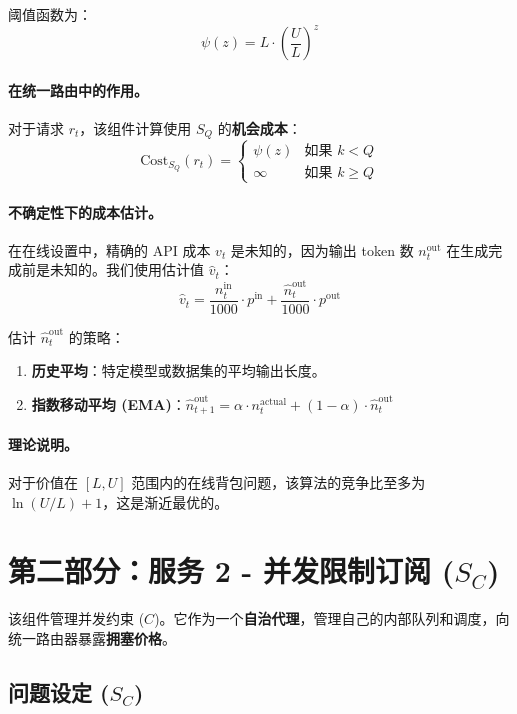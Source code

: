 \documentclass[11pt]{article}
\begin{document}
阈值函数为：
\[ \psi(z) = L \cdot \left( \frac{U}{L} \right)^z \]

\paragraph{在统一路由中的作用。}
对于请求 $r_t$，该组件计算使用 $S_Q$ 的\textbf{机会成本}：
\[ \text{Cost}_{S_Q}(r_t) = \begin{cases} \psi(z) & \text{如果 } k < Q \\ \infty & \text{如果 } k \ge Q \end{cases} \]

\paragraph{不确定性下的成本估计。}
在在线设置中，精确的 API 成本 $v_t$ 是未知的，因为输出 token 数 $n_t^{\text{out}}$ 在生成完成前是未知的。我们使用估计值 $\hat{v}_t$：
\[ \hat{v}_t = \frac{n_t^{\text{in}}}{1000} \cdot p^{\text{in}} + \frac{\hat{n}_t^{\text{out}}}{1000} \cdot p^{\text{out}} \]

估计 $\hat{n}_t^{\text{out}}$ 的策略：
\begin{enumerate}
  \item \textbf{历史平均}：特定模型或数据集的平均输出长度。
  \item \textbf{指数移动平均 (EMA)}：$\hat{n}_{t+1}^{\text{out}} = \alpha \cdot n_t^{\text{actual}} + (1-\alpha) \cdot \hat{n}_t^{\text{out}}$
\end{enumerate}

\paragraph{理论说明。}
对于价值在 $[L, U]$ 范围内的在线背包问题，该算法的竞争比至多为 $\ln(U/L) + 1$，这是渐近最优的。

\section{第二部分：服务 2 - 并发限制订阅 ($S_C$)}
\label{sec:part2}

该组件管理并发约束 ($C$)。它作为一个\textbf{自治代理}，管理自己的内部队列和调度，向统一路由器暴露\textbf{拥塞价格}。

\subsection{问题设定 ($S_C$)}
\end{document}
